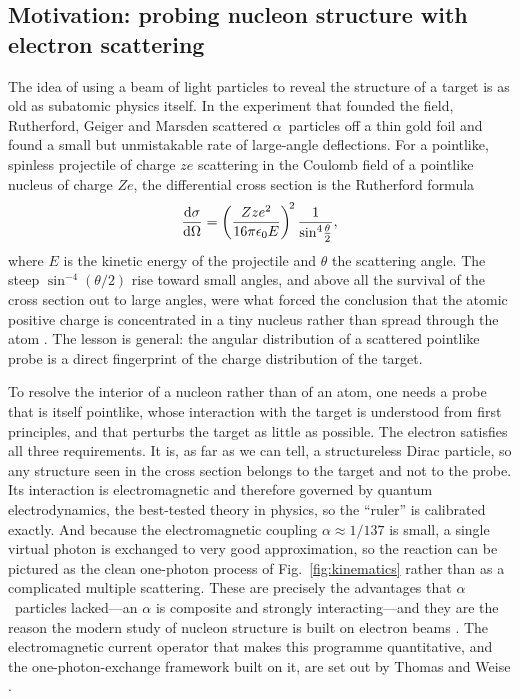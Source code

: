 \subsection{Motivation: probing nucleon structure with electron scattering}
\label{subsec:why-electron-scattering}

The idea of using a beam of light particles to reveal the structure of a target is as
old as subatomic physics itself. In the experiment that founded the field, Rutherford,
Geiger and Marsden scattered $\alpha$~particles off a thin gold foil and found a small
but unmistakable rate of large-angle deflections. For a pointlike, spinless projectile
of charge $ze$ scattering in the Coulomb field of a pointlike nucleus of charge $Ze$,
the differential cross section is the Rutherford formula
\begin{equation}
    \dv{\sigma}{\Omega}
    = \left(\frac{Z z e^{2}}{16\pi\epsilon_0 E}\right)^{\!2}
      \frac{1}{\sin^{4}\!\frac{\theta}{2}},
    \label{eq:rutherford}
\end{equation}
where $E$ is the kinetic energy of the projectile and $\theta$ the scattering angle.
The steep $\sin^{-4}(\theta/2)$ rise toward small angles, and above all the survival of
the cross section out to large angles, were what forced the conclusion that the atomic
positive charge is concentrated in a tiny nucleus rather than spread through the atom
\cite[Ch.~1]{Amsler2018}. The lesson is general: the angular distribution of a
scattered pointlike probe is a direct fingerprint of the charge distribution of the
target.

To resolve the interior of a nucleon rather than of an atom, one needs a probe that is
itself pointlike, whose interaction with the target is understood from first
principles, and that perturbs the target as little as possible. The electron satisfies
all three requirements. It is, as far as we can tell, a structureless Dirac particle,
so any structure seen in the cross section belongs to the target and not to the probe.
Its interaction is electromagnetic and therefore governed by quantum electrodynamics,
the best-tested theory in physics, so the ``ruler'' is calibrated exactly. And because
the electromagnetic coupling $\alpha \approx 1/137$ is small, a single virtual photon
is exchanged to very good approximation, so the reaction can be pictured as the clean
one-photon process of Fig.~\ref{fig:kinematics} rather than as a complicated multiple
scattering. These are precisely the advantages that $\alpha$~particles lacked---an
$\alpha$ is composite and strongly interacting---and they are the reason
the modern study of nucleon structure is built on electron beams
\cite[Ch.~1]{Amsler2018}. The electromagnetic current operator that makes this
programme quantitative, and the one-photon-exchange framework built on it, are set out
by Thomas and Weise \cite[Ch.~1]{ThomasWeise2001}.

